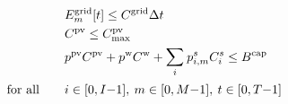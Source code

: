 \begin{subequations}
\begin{align}
        & \qquad E^{\text{grid}}_m[t] \leq C^{\text{grid}} \Delta t \label{eq:parks-grid-cap} \\[\smalleqnskip]
        & \qquad C^{\text{pv}} \leq C^{\text{pv}}_{\max} \\[\smalleqnskip]
        & \qquad p^{\textrm{pv}} C^{\textrm{pv}} + p^{\textrm{w}} C^{\textrm{w}} + \mathlarger{\sum}_i \: p^s_{i,m} C^s_i \leq B^{\text{cap}} \label{eq:parks-budget-cap} \\[\smalleqnskip]
        \text{for all} & \qquad i \in [0,I{-}1], \: m \in [0,M{-}1], \: t \in [0,T{-}1] \tag*{}
        \end{align}
\end{subequations}

